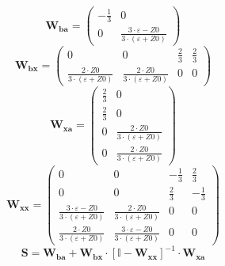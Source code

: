 \[ \mathbf{W_{ba}} = \left(\begin{array}{cc} -\frac{1}{3} & 0 \\ 0 &
\frac{3\cdot \varepsilon-Z0}{3\cdot \left(\varepsilon+Z0\right)}
\end{array}\right) \]
\[ \mathbf{W_{bx}} = \left(\begin{array}{cccc} 0 & 0 & \frac{2}{3} &
\frac{2}{3} \\ \frac{2\cdot Z0}{3\cdot \left(\varepsilon+Z0\right)} &
\frac{2\cdot Z0}{3\cdot \left(\varepsilon+Z0\right)} & 0 & 0
\end{array}\right) \]
\[ \mathbf{W_{xa}} = \left(\begin{array}{cc} \frac{2}{3} & 0 \\
\frac{2}{3} & 0 \\ 0 & \frac{2\cdot Z0}{3\cdot
\left(\varepsilon+Z0\right)} \\ 0 & \frac{2\cdot Z0}{3\cdot
\left(\varepsilon+Z0\right)} \end{array}\right) \]
\[ \mathbf{W_{xx}} = \left(\begin{array}{cccc} 0 & 0 & -\frac{1}{3} &
\frac{2}{3} \\ 0 & 0 & \frac{2}{3} & -\frac{1}{3} \\ \frac{3\cdot
\varepsilon-Z0}{3\cdot \left(\varepsilon+Z0\right)} & \frac{2\cdot
Z0}{3\cdot \left(\varepsilon+Z0\right)} & 0 & 0 \\ \frac{2\cdot
Z0}{3\cdot \left(\varepsilon+Z0\right)} & \frac{3\cdot
\varepsilon-Z0}{3\cdot \left(\varepsilon+Z0\right)} & 0 & 0
\end{array}\right) \]
\[ \mathbf{S}=\mathbf{W_{ba}}+\mathbf{W_{bx}}\cdot\left[ \mathbb{I}
-\mathbf{W_{xx}}\right]^{-1}\cdot\mathbf{W_{xa}} \]
